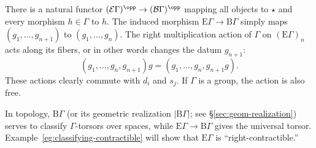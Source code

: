 \begin{example}
	There is a natural functor
	$(\mathcal{E}\Gamma)^{\opp}\to(\mathcal{B}\Gamma)^{\opp}$ mapping all
	objects to $\star$ and every morphism $h\in\Gamma$ to $h$. The induced
	morphism $\mathrm{E}\Gamma\to\mathrm{B}\Gamma$ simply maps
	$(g_1,\ldots,g_{n+1})$ to $(g_1,\ldots,g_n)$. The right multiplication
	action of $\Gamma$ on $(\mathrm{E}\Gamma)_n$ acts along its fibers, or in
	other words changes the datum $g_{n+1}$:
	\[ (g_1, \ldots, g_n, g_{n+1})g = (g_1, \ldots, g_n, g_{n+1}g). \]
	These actions clearly commute with $d_i$ and $s_j$. If $\Gamma$ is a
	group, the action is also free.

	In topology, $\mathrm{B}\Gamma$ (or its geometric realization
	$|\mathrm{B}\Gamma|$; see \S\ref{sec:geom-realization}) serves to
	classify $\Gamma$-torsors over spaces, while
	$\mathrm{E}\Gamma\to\mathrm{B}\Gamma$ gives the universal torsor.
	Example~\ref{eg:classifying-contractible} will show that
	$\mathrm{E}\Gamma$ is ``right-contractible.''
\end{example}
